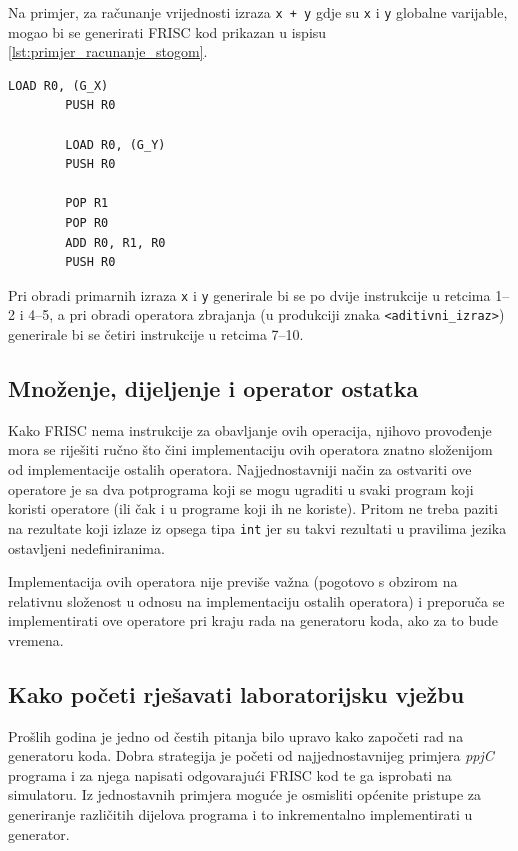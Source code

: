 \documentclass[times, 12pt, utf8]{book}
\begin{document}
Na primjer, za računanje vrijednosti izraza \verb|x + y| gdje su \verb|x| i \verb|y| globalne varijable, mogao bi se generirati FRISC kod prikazan u ispisu \ref{lst:primjer_racunanje_stogom}.

\begin{lstlisting}[caption={Računanje izraza \texttt{x + y} primjenom stoga.},label=lst:primjer_racunanje_stogom]
        LOAD R0, (G_X)
        PUSH R0

        LOAD R0, (G_Y)
        PUSH R0

        POP R1
        POP R0
        ADD R0, R1, R0
        PUSH R0
\end{lstlisting}

Pri obradi primarnih izraza \verb|x| i \verb|y| generirale bi se po dvije instrukcije u retcima 1--2 i 4--5, a pri obradi operatora zbrajanja (u produkciji znaka \verb|<aditivni_izraz>|) generirale bi se četiri instrukcije u retcima 7--10.

\subsection{Množenje, dijeljenje i operator ostatka}
Kako FRISC nema instrukcije za obavljanje ovih operacija, njihovo provođenje mora se riješiti ručno što čini implementaciju ovih operatora znatno složenijom od implementacije ostalih operatora.
Najjednostavniji način za ostvariti ove operatore je sa dva potprograma koji se mogu ugraditi u svaki program koji koristi operatore (ili čak i u programe koji ih ne koriste).
Pritom ne treba paziti na rezultate koji izlaze iz opsega tipa \verb|int| jer su takvi rezultati u pravilima jezika ostavljeni nedefiniranima.

Implementacija ovih operatora nije previše važna (pogotovo s obzirom na relativnu složenost u odnosu na implementaciju ostalih operatora) i preporuča se implementirati ove operatore pri kraju rada na generatoru koda, ako za to bude vremena.

\subsection{Kako početi rješavati laboratorijsku vježbu}
Prošlih godina je jedno od čestih pitanja bilo upravo kako započeti rad na generatoru koda.
Dobra strategija je početi od najjednostavnijeg primjera \emph{ppjC} programa i za njega napisati odgovarajući FRISC kod te ga isprobati na simulatoru.
Iz jednostavnih primjera moguće je osmisliti općenite pristupe za generiranje različitih dijelova programa i to inkrementalno implementirati u generator.
\end{document}
